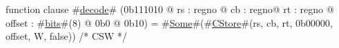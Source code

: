 function clause #\hyperref[zdecode]{decode}# (0b111010 @ rs : regno @ cb : regno@ rt : regno @ offset : #\hyperref[zbits]{bits}#(8) @ 0b0 @ 0b10) = #\hyperref[zSome]{Some}#(#\hyperref[zCStore]{CStore}#(rs, cb, rt, 0b00000, offset, W, false)) /* CSW */
